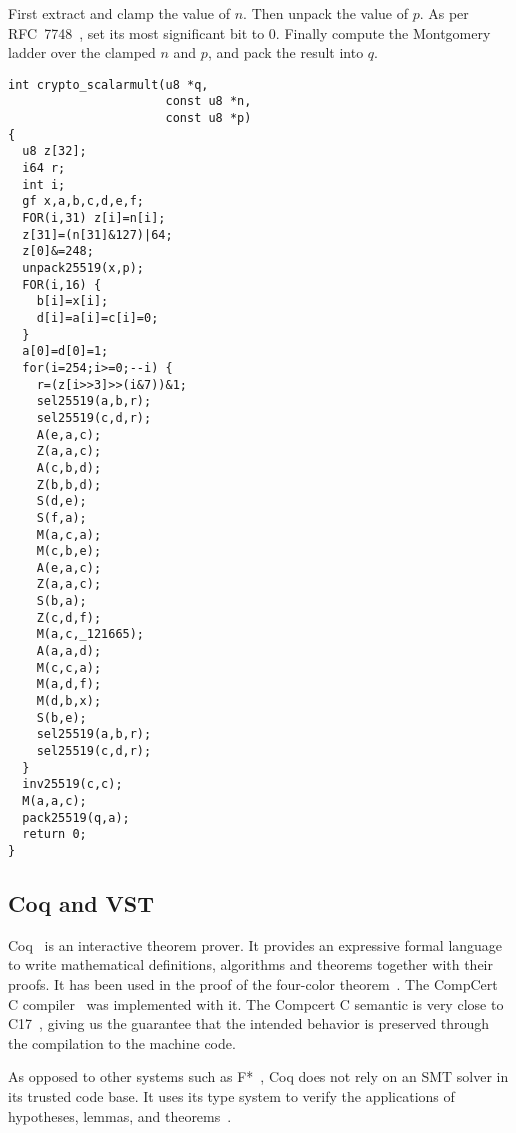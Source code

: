 First extract and clamp the value of $n$. Then unpack the value of $p$.
As per RFC~7748~\cite{rfc7748}, set its most significant bit to 0.
Finally compute the Montgomery ladder over the clamped $n$ and $p$,
and pack the result into $q$.
\begin{lstlisting}[language=Ctweetnacl]
int crypto_scalarmult(u8 *q,
                      const u8 *n,
                      const u8 *p)
{
  u8 z[32];
  i64 r;
  int i;
  gf x,a,b,c,d,e,f;
  FOR(i,31) z[i]=n[i];
  z[31]=(n[31]&127)|64;
  z[0]&=248;
  unpack25519(x,p);
  FOR(i,16) {
    b[i]=x[i];
    d[i]=a[i]=c[i]=0;
  }
  a[0]=d[0]=1;
  for(i=254;i>=0;--i) {
    r=(z[i>>3]>>(i&7))&1;
    sel25519(a,b,r);
    sel25519(c,d,r);
    A(e,a,c);
    Z(a,a,c);
    A(c,b,d);
    Z(b,b,d);
    S(d,e);
    S(f,a);
    M(a,c,a);
    M(c,b,e);
    A(e,a,c);
    Z(a,a,c);
    S(b,a);
    Z(c,d,f);
    M(a,c,_121665);
    A(a,a,d);
    M(c,c,a);
    M(a,d,f);
    M(d,b,x);
    S(b,e);
    sel25519(a,b,r);
    sel25519(c,d,r);
  }
  inv25519(c,c);
  M(a,a,c);
  pack25519(q,a);
  return 0;
}
\end{lstlisting}





\subsection{Coq and VST}
\label{subsec:Coq-VST}

Coq~\cite{coq-faq} is an interactive theorem prover. It provides an expressive
formal language to write mathematical definitions, algorithms and theorems together
with their proofs. It has been used in the proof of the four-color theorem~\cite{gonthier2008formal}.
The CompCert C compiler~\cite{Leroy-backend} was implemented with it.
The Compcert C semantic is very close to C17~\cite{ISO:C17}, giving us the guarantee
that the intended behavior is preserved through the compilation to the machine code.

As opposed to other systems such as F*~\cite{DBLP:journals/corr/BhargavanDFHPRR17},
Coq does not rely on an SMT solver in its trusted code base.
It uses its type system to verify the applications of hypotheses,
lemmas, and theorems~\cite{Howard1995-HOWTFN}.

